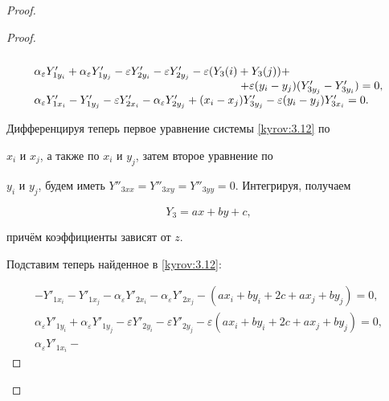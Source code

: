 \begin{proof}
\begin{proof}
\begin{equation}
\begin{array}{l}
\\

\alpha_{\varepsilon}Y'_{1y_i} + \alpha_{\varepsilon}Y'_{1y_j}

-\varepsilon Y'_{2y_i} -\varepsilon Y'_{2y_j} - \varepsilon(Y_3(i)

+ Y_3(j)) + \\

\hspace{6.45cm} +\varepsilon(y_i - y_j)(Y'_{3y_j} - Y'_{3y_i}) = 0,\\

\alpha_{\varepsilon}Y'_{1x_i} - Y'_{1y_j} - \varepsilon Y'_{2x_i}

- \alpha_{\varepsilon}Y'_{2y_j} + (x_i - x_j)Y'_{3y_j} -

\varepsilon(y_i-y_j)Y'_{3x_i} = 0. \end{array}\end{equation}

Дифференцируя теперь первое уравнение системы \eqref{kyrov:3.12} по

$x_i$ и $x_j$, а также по $x_i$ и $y_j$, затем второе уравнение по

$y_i$ и $y_j$, будем иметь $ Y''_{3xx} = Y''_{3xy} = Y''_{3yy} =

0$. Интегрируя, получаем

\begin{equation}

\label{kyrov:3.13}

Y_{3} = ax +

by + c,

\end{equation}

причём коэффициенты зависят от $z$.

Подставим теперь найденное в \eqref{kyrov:3.12}:

\begin{equation*}

\begin{array}{l}

-Y'_{1x_i} - Y'_{1x_j} - \alpha_{\varepsilon}Y'_{2x_i} - \alpha_{\varepsilon}Y'_{2x_j} - (ax_i + by_i + 2c + ax_j + by_j) = 0, \\

\alpha_{\varepsilon}Y'_{1y_i} + \alpha_{\varepsilon}Y'_{1y_j}

-\varepsilon Y'_{2y_i} -\varepsilon Y'_{2y_j} - \varepsilon(ax_i +

by_i + 2c + ax_j + by_j) = 0,\\ \alpha_{\varepsilon}Y'_{1x_i} -


\end{array}
\end{equation*}
\end{proof}
\end{proof}
